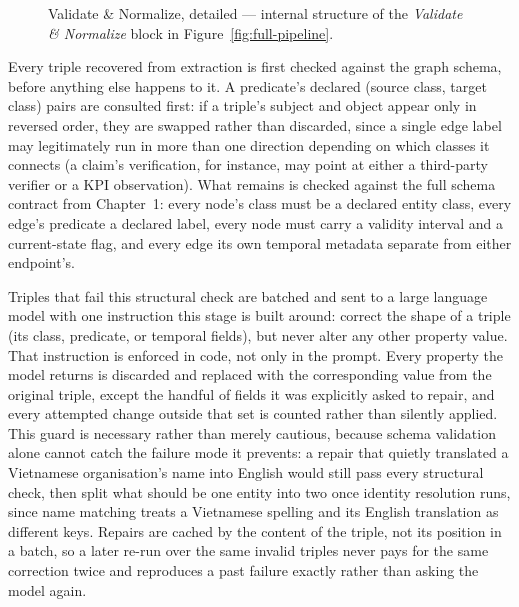 \documentclass[fontsize=12pt,oneside,headings=small]{scrreprt}
\begin{document}
\begin{figure}[H]
{%
  }
  \caption[Validate \& Normalize, detailed]{Validate \& Normalize, detailed ---
    internal structure of the \emph{Validate \& Normalize} block in
    Figure~\ref{fig:full-pipeline}.}
  \label{fig:validate-normalize-detail}
\end{figure}

Every triple recovered from extraction is first checked against the graph schema, before anything else happens to it. A predicate's declared (source class, target class) pairs are consulted first: if a triple's subject and object appear only in reversed order, they are swapped rather than discarded, since a single edge label may legitimately run in more than one direction depending on which classes it connects (a claim's verification, for instance, may point at either a third-party verifier or a KPI observation). What remains is checked against the full schema contract from Chapter~1: every node's class must be a declared entity class, every edge's predicate a declared label, every node must carry a validity interval and a current-state flag, and every edge its own temporal metadata separate from either endpoint's.

Triples that fail this structural check are batched and sent to a large language model with one instruction this stage is built around: correct the shape of a triple (its class, predicate, or temporal fields), but never alter any other property value. That instruction is enforced in code, not only in the prompt. Every property the model returns is discarded and replaced with the corresponding value from the original triple, except the handful of fields it was explicitly asked to repair, and every attempted change outside that set is counted rather than silently applied. This guard is necessary rather than merely cautious, because schema validation alone cannot catch the failure mode it prevents: a repair that quietly translated a Vietnamese organisation's name into English would still pass every structural check, then split what should be one entity into two once identity resolution runs, since name matching treats a Vietnamese spelling and its English translation as different keys. Repairs are cached by the content of the triple, not its position in a batch, so a later re-run over the same invalid triples never pays for the same correction twice and reproduces a past failure exactly rather than asking the model again.
\end{document}
